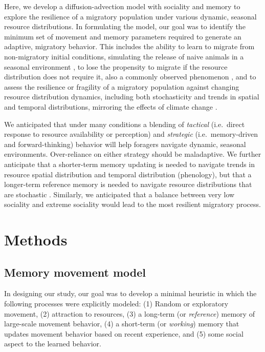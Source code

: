 \documentclass[utf8]{frontiersSCNS} %
\begin{document}
	Here, we develop a diffusion-advection model with sociality and memory to explore the resilience of a migratory population under various dynamic, seasonal resource distributions. In formulating the model, our goal was to identify the minimum set of movement and memory parameters required to generate an adaptive, migratory behavior. This includes the ability to learn to migrate from non-migratory initial conditions, simulating the release of naive animals in a seasonal environment \citep{Jesmer2018}, to lose the propensity to migrate if the resource distribution does not require it, also a commonly observed phenomenon \citep{Wilcove2008}, and to assess the resilience or fragility of a migratory population against changing resource distribution dynamics, including both stochasticity and trends in spatial and temporal distributions, mirroring the effects of climate change \citep{Park2020}.
	
	We anticipated that under many conditions a blending of \emph{tactical} (i.e.~direct response to resource availability or perception) and \emph{strategic} (i.e.~memory-driven and forward-thinking) behavior will help foragers navigate dynamic, seasonal environments. Over-reliance on either strategy should be maladaptive. We further anticipate that a shorter-term memory updating is needed to navigate trends in resource spatial distribution and temporal distribution (phenology), but that a longer-term reference memory is needed to navigate resource distributions that are stochastic \citep{Lin2021}. Similarly, we anticipated that a balance between very low sociality and extreme sociality would lead to the most resilient migratory process. 
	
	\section{Methods}
	
	\subsection{Memory movement model}
	
	In designing our study, our goal was to develop a minimal heuristic in which the following processes were explicitly modeled: (1) Random or exploratory movement, (2) attraction to resources, (3) a long-term (or \emph{reference}) memory of large-scale movement behavior, (4) a short-term (or \emph{working}) memory that updates movement behavior based on recent experience, and (5) some social aspect to the learned behavior.
	
\end{document}
